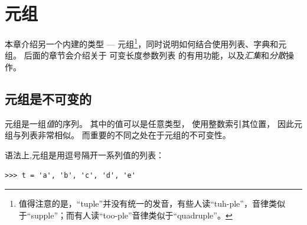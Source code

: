 

\chapter{元组}
\label{tuplechap}


本章介绍另一个内建的类型 --- 元组\footnote{值得注意的是，``tuple''并没有统一的发音，有些人读``tuh-ple''，音律类似于``supple''；而有人读``too-ple''音律类似于``quadruple''。}，同时说明如何结合使用列表、字典和元组。  
后面的章节会介绍关于 可变长度参数列表 的有用功能，以及\emph{汇集}和\emph{分散}操作。

\section{元组是不可变的}
    

  

元组是一组\emph{值}的序列。  
其中的值可以是任意类型， 使用整数索引其位置， 因此元组与列表非常相似。  
而重要的不同之处在于元组的不可变性。


语法上,元组是用逗号隔开一系列值的列表：

\begin{lstlisting}
>>> t = 'a', 'b', 'c', 'd', 'e'
\end{lstlisting}
%

